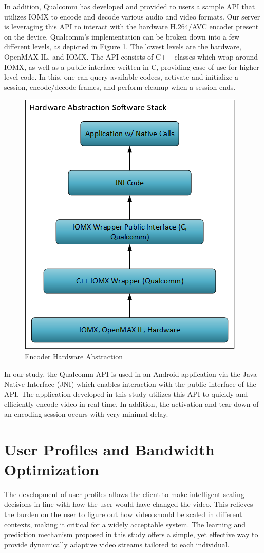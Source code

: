 \documentclass[a4paper,12pt]{article}
\begin{document}
In addition, Qualcomm has developed and provided to users a sample API that utilizes IOMX to encode and decode various audio and video formats. Our server is leveraging this API to interact with the hardware H.264/AVC encoder present on the device. Qualcomm's implementation can be broken down into a few different levels, as depicted in Figure \ref{fig:QualcommAPI}. The lowest levels are the hardware, OpenMAX IL, and IOMX. The API consists of C++ classes which wrap around IOMX, as well as a public interface written in C, providing ease of use for higher level code. In this, one can query available codecs, activate and initialize a session, encode/decode frames, and perform cleanup when a session ends.
\begin{figure}[h]
\centering
\includegraphics[width=0.4\linewidth]{QualcommAPI.png}
\caption{Encoder Hardware Abstraction}
\label{fig:QualcommAPI}
\end{figure}
In our study, the Qualcomm API is used in an Android application via the Java Native Interface (JNI) which enables interaction with the public interface of the API. The application developed in this study utilizes this API to quickly and efficiently encode video in real time. In addition, the activation and tear down of an encoding session occurs with very minimal delay.


\section{User Profiles and Bandwidth Optimization}
\label{sec:UserProfiles}

The development of user profiles allows the client to make intelligent scaling decisions in line with how the user would have changed the video. This relieves the burden on the user to figure out how video should be scaled in different contexts, making it critical for a widely acceptable system. The learning and prediction mechanism proposed in this study offers a simple, yet effective way to provide dynamically adaptive video streams tailored to each individual.
\end{document}
